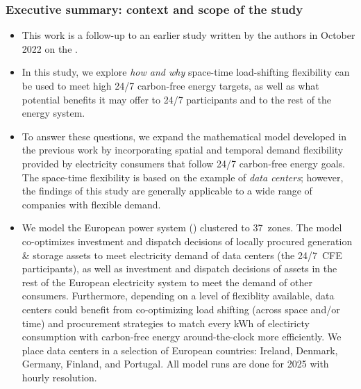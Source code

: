 \begin{frame}
  \frametitle{Executive summary: context and scope of the study}

{\footnotesize
  \begin{itemize}
    \vspace{-0.2cm}
    \item This work is a follow-up to an earlier study written by the authors in October 2022 on the .\\
    
    \item In this study, we explore \textit{how and why} space-time load-shifting flexibility can be used to meet high \alert{24/7 carbon-free energy targets}, as well as what potential benefits it may offer to 24/7 participants and to the rest of the energy system.

    \item To answer these questions, we expand the mathematical model developed in the previous work by incorporating \alert{spatial and temporal demand flexibility} provided by electricity consumers that follow 24/7 carbon-free energy goals. The space-time flexibility is based on the example of \textit{data centers}; however, the findings of this study are generally applicable to a wide range of companies with flexible demand.
    
    \item We model the European power system () clustered to \alert{37~zones}. The model \alert{co-optimizes} investment and dispatch decisions of \alert{locally procured} generation \& storage assets to meet electricity demand of data centers (the 24/7~CFE participants), as well as investment and dispatch decisions of assets in the rest of the European electricity system to meet the demand of other consumers. Furthermore, depending on a level of flexiblity available, data centers could benefit from co-optimizing load shifting (across space and/or time) and procurement strategies to match every kWh of electiricty consumption with carbon-free energy around-the-clock more efficiently. We place data centers in a selection of European countries: Ireland, Denmark, Germany, Finland, and Portugal. All model runs are done for \alert{2025} with \alert{hourly resolution}.

  \end{itemize}
}
\end{frame}


